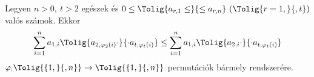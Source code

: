 Legyen $n>0,\ t>2$ egészek és $0\le\Tolig{a_{r,1}\le}{\le a_{r,n}} \ (\Tolig{r=1,}{,t})$ valós számok.
Ekkor 
$$
\sum_{i=1}^{n} a_{1,i}\Tolig{a_{2,\varphi_{2}(i)}\cdot}{\cdot a_{t,\varphi_{t}(i)}} \le 
\sum_{i=1}^{n} a_{1,i}\Tolig{a_{2,i}\cdot}{\cdot a_{t,\varphi_{t}(i)}}
$$
$\varphi_:\Tolig{\{1,}{,n\}}\to\Tolig{\{1,}{,n\}}$ permutációk bármely rendszerére.
